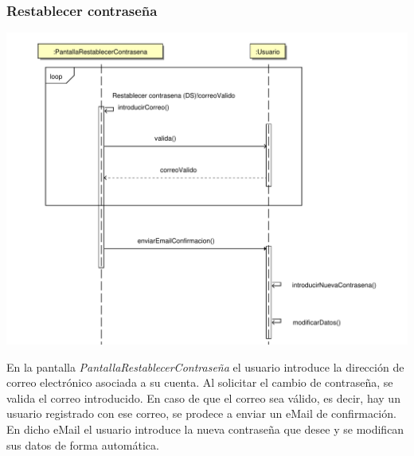 \documentclass[11pt, a4paper, twoside, titlepage]{article}
\begin{document}
			\subsubsection{Restablecer contraseña}
				\begin{center}
					\includegraphics[scale=.6]{diseno/diagramas/restablecercontrasena.pdf}
				\end{center}

				En la pantalla {\itshape PantallaRestablecerContraseña} el usuario introduce la dirección de correo electrónico asociada a su cuenta. Al solicitar el cambio de contraseña, se valida el correo introducido. En caso de que el correo sea válido, es decir, hay un usuario registrado con ese correo, se prodece a enviar un eMail de confirmación. En dicho eMail el usuario introduce la nueva contraseña que desee y se modifican sus datos de forma automática.
\end{document}
